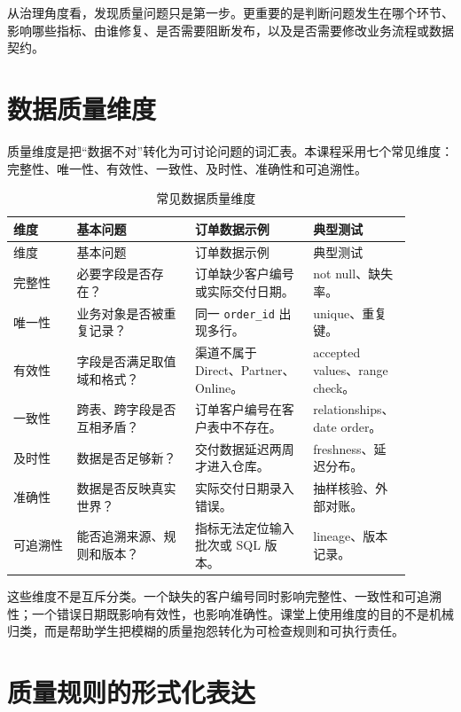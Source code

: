 \documentclass[UTF8,fontset=fandol,openany,zihao=-4]{ctexbook}
\begin{document}
\begin{remark}
从治理角度看，发现质量问题只是第一步。更重要的是判断问题发生在哪个环节、影响哪些指标、由谁修复、是否需要阻断发布，以及是否需要修改业务流程或数据契约。
\end{remark}

\section{数据质量维度}

质量维度是把“数据不对”转化为可讨论问题的词汇表。本课程采用七个常见维度：完整性、唯一性、有效性、一致性、及时性、准确性和可追溯性。

\begin{longtable}{>{\raggedright\arraybackslash}p{0.15\linewidth}>{\raggedright\arraybackslash}p{0.28\linewidth}>{\raggedright\arraybackslash}p{0.28\linewidth}>{\raggedright\arraybackslash}p{0.18\linewidth}}
\caption{常见数据质量维度}\\
\toprule
维度 & 基本问题 & 订单数据示例 & 典型测试\\
\midrule
\endfirsthead
\toprule
维度 & 基本问题 & 订单数据示例 & 典型测试\\
\midrule
\endhead
完整性 & 必要字段是否存在？ & 订单缺少客户编号或实际交付日期。 & not null、缺失率。\\
唯一性 & 业务对象是否被重复记录？ & 同一 \texttt{order\_id} 出现多行。 & unique、重复键。\\
有效性 & 字段是否满足取值域和格式？ & 渠道不属于 Direct、Partner、Online。 & accepted values、range check。\\
一致性 & 跨表、跨字段是否互相矛盾？ & 订单客户编号在客户表中不存在。 & relationships、date order。\\
及时性 & 数据是否足够新？ & 交付数据延迟两周才进入仓库。 & freshness、延迟分布。\\
准确性 & 数据是否反映真实世界？ & 实际交付日期录入错误。 & 抽样核验、外部对账。\\
可追溯性 & 能否追溯来源、规则和版本？ & 指标无法定位输入批次或 SQL 版本。 & lineage、版本记录。\\
\bottomrule
\end{longtable}

这些维度不是互斥分类。一个缺失的客户编号同时影响完整性、一致性和可追溯性；一个错误日期既影响有效性，也影响准确性。课堂上使用维度的目的不是机械归类，而是帮助学生把模糊的质量抱怨转化为可检查规则和可执行责任。

\section{质量规则的形式化表达}
\end{document}
